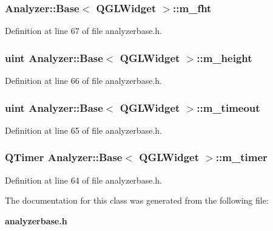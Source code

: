 \subsubsection{ {\bf Analyzer::Base}$<$ {\bf QGLWidget}  $>$::{\bf m\_\-fht}\hspace{0.3cm}{\tt  [protected, inherited]}}\label{classAnalyzer_1_1Base_Analyzer_1_1Basep3}




Definition at line 67 of file analyzerbase.h.
\subsubsection{\setlength{\rightskip}{0pt plus 5cm}uint {\bf Analyzer::Base}$<$ {\bf QGLWidget}  $>$::{\bf m\_\-height}\hspace{0.3cm}{\tt  [protected, inherited]}}\label{classAnalyzer_1_1Base_Analyzer_1_1Basep2}




Definition at line 66 of file analyzerbase.h.
\subsubsection{\setlength{\rightskip}{0pt plus 5cm}uint {\bf Analyzer::Base}$<$ {\bf QGLWidget}  $>$::{\bf m\_\-timeout}\hspace{0.3cm}{\tt  [protected, inherited]}}\label{classAnalyzer_1_1Base_Analyzer_1_1Basep1}




Definition at line 65 of file analyzerbase.h.
\subsubsection{\setlength{\rightskip}{0pt plus 5cm}QTimer {\bf Analyzer::Base}$<$ {\bf QGLWidget}  $>$::{\bf m\_\-timer}\hspace{0.3cm}{\tt  [protected, inherited]}}\label{classAnalyzer_1_1Base_Analyzer_1_1Basep0}




Definition at line 64 of file analyzerbase.h.

The documentation for this class was generated from the following file:\begin{CompactItemize}
\item 
{\bf analyzerbase.h}\end{CompactItemize}
